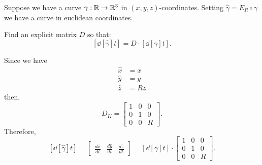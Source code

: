 \documentclass[newpage,hints,handout,12pt,noauthor,nooutcomes]{ximera}
\begin{document}
\begin{problem}
  Suppose we have a curve $\gamma:\mathbb R\to\mathbb R^3$ in
  $(x,y,z)$-coordinates. Setting $\hat \gamma = E_R\circ\gamma$ we have
  a curve in euclidean coordinates. 
  \begin{center}
  \end{center}
  Find an explicit matrix $D$ so that:
  \[
  \left[\dd[\hat{\gamma}]{t}\right] = D \cdot \left[ \dd[\gamma]{t}\right].
  \]
  
\begin{freeResponse}
Since we have 
\begin{align*}
\hat{x}  &  =x\\
\hat{y}  &  =y\\
\hat{z}  &  =Rz
\end{align*}
then, 
\[
D_K = 
 \begin{bmatrix}
    1 & 0 & 0\\
    0 & 1 & 0\\
    0 & 0 & R
  \end{bmatrix}.
  \]
  Therefore, 
  \[
 \left[\dd[\hat{\gamma}]{t}\right] 
= \begin{bmatrix}
\frac{d\hat{x}}{dt} & \frac{d\hat{y}}{dt} & \frac{d\hat{z}}{dt}%
\end{bmatrix}
= \left[ \dd[\gamma]{t}\right] \cdot
  \begin{bmatrix}
    1 & 0 & 0\\
    0 & 1 & 0\\
    0 & 0 & R
  \end{bmatrix}.
\]
\end{freeResponse}

\end{problem}
\end{document}
